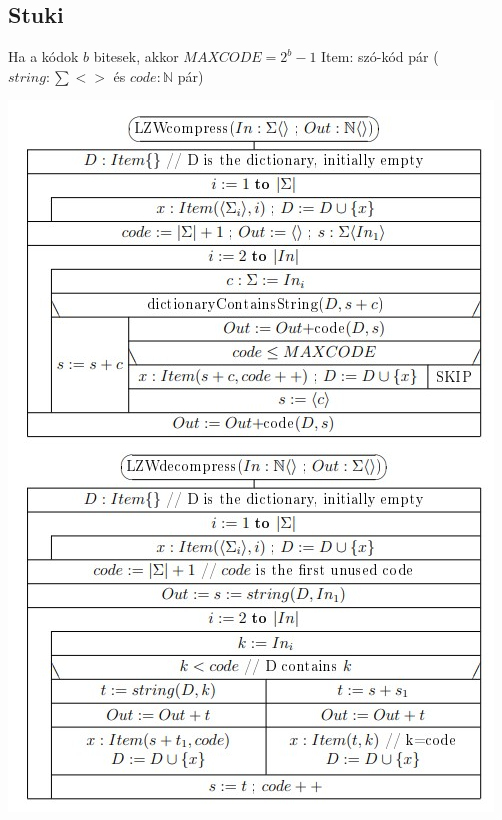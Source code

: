\documentclass[12pt,a4paper]{article}
\begin{document}
\pagebreak

\subsection{Stuki}

\begin{outline}
	\1 Ha a kódok $b$ bitesek, akkor $MAXCODE = 2^b-1$
	\1 Item: szó-kód pár ($string:\sum <>$ és $code:\mathbb{N}$ pár)
\end{outline}

\includegraphics[width=0.8\linewidth]{lzw}
\end{document}
